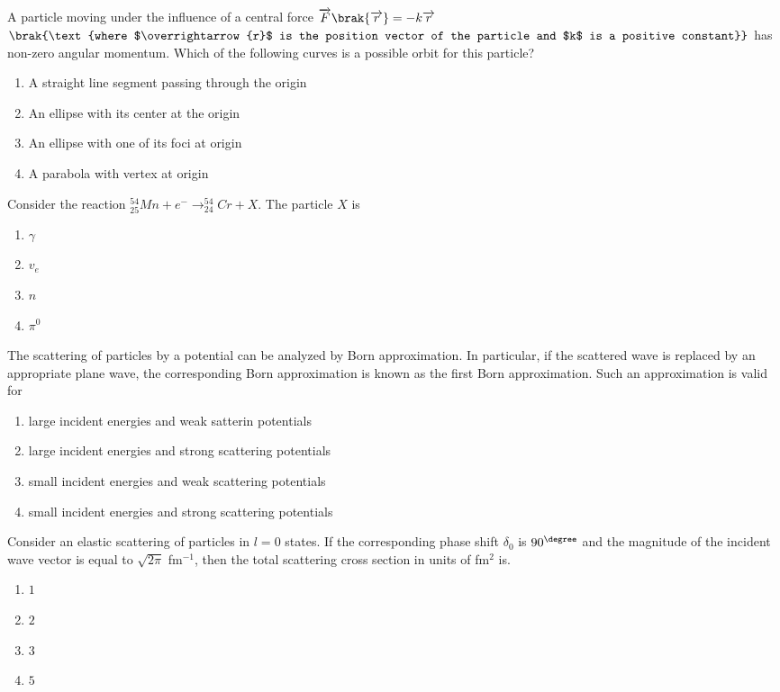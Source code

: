 \item{
A particle moving under the influence of a central force $\overrightarrow{F}\brak{\overrightarrow{r}} = -k\overrightarrow{r}$ $\brak{\text{where $\overrightarrow{r}$ is the position vector of the particle and $k$ is a positive constant}}$ has non-zero angular momentum. Which of the following curves is a possible orbit for this particle?
\begin{enumerate}
\item A straight line segment passing through the origin
\item An ellipse with its center at the origin 
\item An ellipse with one of its foci at origin
\item A parabola with vertex at origin
\end{enumerate}
}
\item{
Consider the reaction $_{25}^{54}Mn+e^-\rightarrow_{24}^{54}Cr+X$. The particle $X$ is
\begin{multicols}{4}
\begin{enumerate}
\item $\gamma$
\item $v_e$
\item $n$
\item $\pi^0$
\end{enumerate}
\end{multicols}
}
\item{
The scattering of particles by a potential can be analyzed by Born approximation. In particular, if the scattered wave is replaced by an appropriate plane wave, the corresponding Born approximation is known as the first Born approximation. Such an approximation is valid for
\begin{enumerate}
\item large incident energies and weak satterin potentials
\item large incident energies and strong scattering potentials
\item small incident energies and weak scattering potentials
\item small incident energies and strong scattering potentials
\end{enumerate}
}
\item{
Consider an elastic scattering of particles in $l = 0$ states. If the corresponding phase shift $\delta_0$ is $90^{\degree}$ and the magnitude of the incident wave vector is equal to $\sqrt{2\pi}$ fm$^{-1}$, then the total scattering cross section in units of fm$^2$ is.
\begin{multicols}{4}
\begin{enumerate}
\item $1$
\item $2$
\item $3$
\item $5$
\end{enumerate}
\end{multicols}
}
